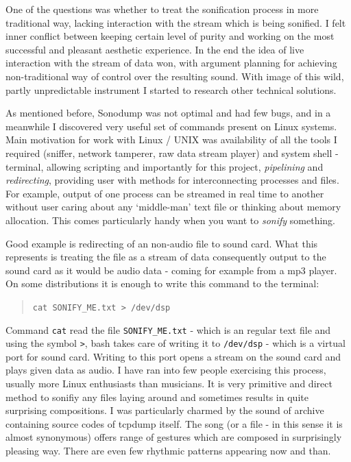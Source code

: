 \documentclass[12pt,a4paper,oneside]{report}
\begin{document}
One of the questions was whether to treat the sonification process in more traditional way, lacking interaction with the stream which is being sonified. I felt inner conflict between keeping certain level of purity and working on the most successful and pleasant aesthetic experience. In the end the idea of live interaction with the stream of data won, with argument planning for achieving non-traditional way of control over the resulting sound. With image of this wild, partly unpredictable instrument I started to research other technical solutions.

As mentioned before, Sonodump was not optimal and had few bugs, and in a meanwhile I discovered very useful set of commands present on Linux systems. Main motivation for work with Linux / UNIX was availability of all the tools I required (sniffer, network tamperer, raw data stream player) and system shell - terminal, allowing scripting and importantly for this project, \emph{pipelining} and \emph{redirecting}, providing user with methods for interconnecting processes and files. For example, output of one process can be streamed in real time to another without user caring about any `middle-man' text file or thinking about memory allocation. This comes particularly handy when you want to \emph{sonify} something. 

Good example is redirecting of an non-audio file to sound card. What this represents is treating the file as a stream of data consequently output to the sound card as it would be audio data - coming for example from a mp3 player. On some distributions it is enough to write this command to the terminal:
\begin{quotation}
	\texttt{cat SONIFY\_ME.txt > /dev/dsp} 
\end{quotation}

Command \texttt{cat} read the file \texttt{SONIFY\_ME.txt} - which is an regular text file and using the symbol \texttt{>}, bash takes care of writing it to \texttt{/dev/dsp} - which is a virtual port for sound card. Writing to this port opens a stream on the sound card and plays given data as audio. I have ran into few people exercising this process, usually more Linux enthusiasts than musicians. It is very primitive and direct method to sonifiy any files laying around and sometimes results in quite surprising compositions. I was particularly charmed by the sound of archive containing source codes of tcpdump itself. The song (or a file - in this sense it is almost synonymous) offers range of gestures which are composed in surprisingly pleasing way. There are even few rhythmic patterns appearing now and than.
\end{document}
